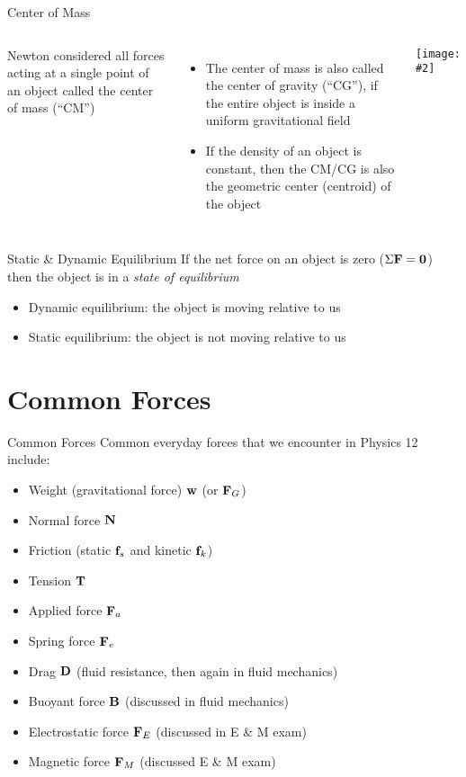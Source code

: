 \documentclass[12pt,compress,aspectratio=169]{beamer}
\newcommand{\pic}[2]{\texttt{[image: \#2]}}
\newcommand{\mb}[1]{\ensuremath\mathbf{#1}}
\begin{document}
\begin{frame}{Center of Mass}
  \vspace{.2in}
  \begin{columns}
    Newton considered all forces acting at a single point of an object called
    the center of mass (``CM'')
    \begin{itemize}
    \item The center of mass is also called the center of gravity (``CG''), if
      the entire object is inside a uniform gravitational field
    \item If the density of an object is constant, then the CM/CG is also the
      geometric center (centroid) of the object
    \end{itemize}

    \pic{1}{graphics/cofm.png}
  \end{columns}
\end{frame}

\begin{frame}{Static \& Dynamic Equilibrium}
  If the net force on an object is zero ($\Sigma\mb{F}=\mb{0}$) then the
  object is in a \emph{state of equilibrium}
  \begin{itemize}
  \item Dynamic equilibrium: the object is moving relative to us
  \item Static equilibrium: the object is not moving relative to us
  \end{itemize}
\end{frame}


\section{Common Forces}

\begin{frame}{Common Forces}
  Common everyday forces that we encounter in Physics 12 include:
  \begin{itemize}
  \item Weight (gravitational force) $\mb{w}$ (or $\mb{F}_G$)
  \item Normal force $\mb{N}$
  \item Friction (static $\mb{f}_s$ and kinetic $\mb{f}_k$)
  \item Tension $\mb{T}$
  \item Applied force $\mb{F}_a$
  \item Spring force $\mb{F}_e$
  \item Drag $\mb{D}$ (fluid resistance, then again in fluid mechanics)
  \item Buoyant force $\mb{B}$ (discussed in fluid mechanics)
  \item Electrostatic force $\mb{F}_E$ (discussed in E \& M exam)
  \item Magnetic force $\mb{F}_M$ (discussed E \& M exam)
  \end{itemize}
\end{frame}
\end{document}
